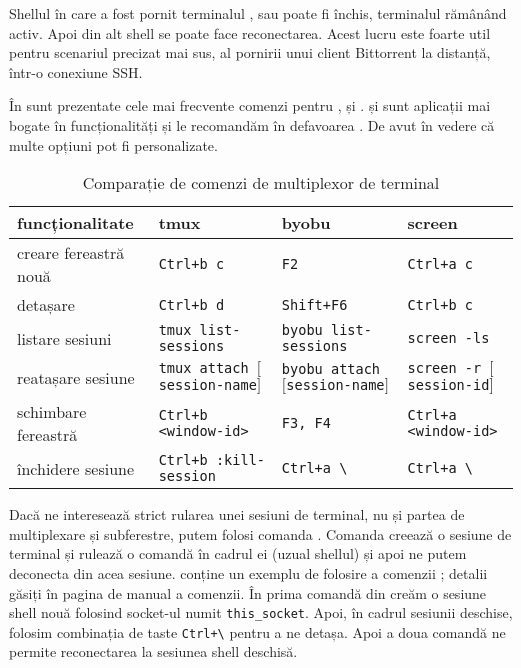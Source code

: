 Shellul în care a fost pornit terminalul ,  sau  poate fi
închis, terminalul rămânând activ. Apoi din alt shell se poate face
reconectarea. Acest lucru este foarte util pentru scenariul precizat mai sus, al
pornirii unui client Bittorrent la distanță, într-o conexiune SSH.

În  sunt prezentate cele mai frecvente comenzi pentru ,  și .  și  sunt aplicații mai bogate în funcționalități și le
recomandăm în defavoarea . De avut în vedere că multe opțiuni pot fi personalizate.

\begin{table}[!htb]
  \scriptsize
  \begin{center}
    \begin{tabular}{ p{} p{} p{} p{} }
      \toprule
        \textbf{funcționalitate} & \textbf{tmux} & \textbf{byobu} & \textbf{screen} \\
      \midrule
        creare fereastră nouă & \texttt{Ctrl+b c} & \texttt{F2} & \texttt{Ctrl+a c} \\
      \midrule
        detașare & \texttt{Ctrl+b d} & \texttt{Shift+F6} & \texttt{Ctrl+b c} \\
      \midrule
        listare sesiuni & \texttt{tmux list-sessions} & \texttt{byobu list-sessions} & \texttt{screen -ls} \\
      \midrule
        reatașare sesiune & \texttt{tmux attach $[$session-name$]$} & \texttt{byobu attach $[$session-name$]$} & \texttt{screen -r $[$session-id$]$} \\
      \midrule
        schimbare fereastră & \texttt{Ctrl+b \textless{}window-id>} & \texttt{F3, F4} & \texttt{Ctrl+a \textless{}window-id>} \\
      \midrule
        închidere sesiune & \texttt{Ctrl+b :kill-session} & \texttt{Ctrl+a \textbackslash{}} & \texttt{Ctrl+a \textbackslash{}} \\
      \bottomrule
    \end{tabular}
  \end{center}
  \caption{Comparație de comenzi de multiplexor de terminal}
  \label{tab:process:tmux-screen-byobu}
\end{table}

Dacă ne interesează strict rularea unei sesiuni de terminal, nu și partea de
multiplexare și subferestre, putem folosi comanda . Comanda creează o
sesiune de terminal și rulează o comandă în cadrul ei (uzual shellul) și apoi
ne putem deconecta din acea sesiune.  conține un exemplu de folosire a comenzii ;
detalii găsiți în pagina de manual a comenzii. În prima comandă din  creăm o sesiune shell nouă folosind socket-ul numit \texttt{this\_socket}. Apoi, în cadrul sesiunii deschise, folosim combinația de taste \texttt{Ctrl+\textbackslash{}} pentru a ne detașa. Apoi a doua comandă ne permite reconectarea la sesiunea shell deschisă.

